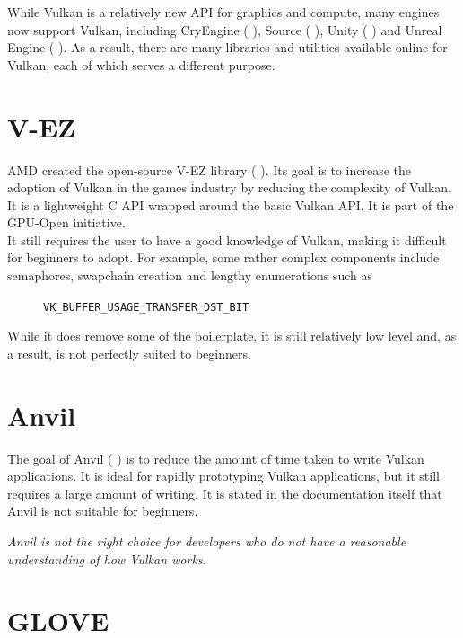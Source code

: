 \documentclass[12pt]{report}
\newcommand{\citebu}[1]{(\citenoparen{#1})}
\newcommand{\citenoparen}[1]{\citeauthor{#1} \citeyear{#1}}
\newcommand{\citesoftware}[1]{(\citeauthor{#1} \citeyear{#1})}
\newcommand{\quotebu}[2]
{
  \begin{displayquote}[\citenoparen{#2}]
    \textit{#1}
  \end{displayquote}
}
\theoremstyle{definition}
\begin{document}
    While Vulkan is a relatively new API for graphics and compute, many engines
    now support Vulkan, including CryEngine \citebu{cryengine}, Source \citebu{source}, Unity \citebu{unity} and Unreal
    Engine \citebu{ue4}. As a result, there are many libraries and utilities available
    online for Vulkan, each of which serves a different purpose.

    \section{V-EZ}

      AMD created the open-source V-EZ library \citesoftware{vez}. Its goal is to increase the
      adoption of Vulkan in the games industry by reducing the complexity of
      Vulkan. It is a lightweight C API wrapped around the basic Vulkan API.
      It is part of the GPU-Open initiative. \\
      
      It still requires the user to have a good knowledge of Vulkan, making it
      difficult for beginners to adopt. For example, some rather complex
      components include semaphores, swapchain creation and lengthy
      enumerations such as

        \begin{figure}[h!]
        \centering
        \verb|VK_BUFFER_USAGE_TRANSFER_DST_BIT|
        \end{figure}

      While it does remove some of the boilerplate, it is still relatively low
      level and, as a result, is not perfectly suited to beginners.

    \section{Anvil}

      The goal of Anvil \citebu{anvil} is to reduce the amount of time taken to write Vulkan
      applications. It is ideal for rapidly prototyping Vulkan applications,
      but it still requires a large amount of writing. It is stated in the
      documentation itself that Anvil is not suitable for beginners.

      \quotebu{
        Anvil is not the right choice for developers who do not have a
        reasonable understanding of how Vulkan works.
      }{anvil}

    \section{GLOVE}
\end{document}
